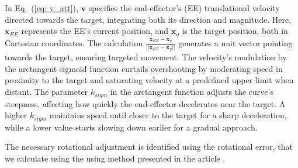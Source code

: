 \documentclass[letterpaper, 10 pt, conference]{ieeeconf}  %
\begin{document}
In Eq.~(\ref{eq: v_att}), $\mathbf{v}$ specifies the end-effector's (EE) translational velocity directed towards the target, integrating both its direction and magnitude. Here, $\mathbf{x}_{EE}$ represents the EE's current position, and $\mathbf{x}_g$ is the target position, both in Cartesian coordinates. The calculation $\frac{\mathbf{x}_{EE}-\mathbf{x}_g}{||\mathbf{x}_{EE}-\mathbf{x}_g||}$ generates a unit vector pointing towards the target, ensuring targeted movement. The velocity's modulation by the arctangent sigmoid function curtails overshooting by moderating speed in proximity to the target and saturating velocity at a predefined upper limit when distant. The parameter \(k_{sigm}\) in the arctangent function adjusts the curve's steepness, affecting how quickly the end-effector decelerates near the target. A higher \(k_{sigm}\) maintains speed until closer to the target for a sharp deceleration, while a lower value starts slowing down earlier for a gradual approach. 


The necessary rotational adjustment is identified using the rotational error, that we calculate using the using method presented in the article \cite{Zlajpah2017}. 
%
%
%
%
%
%
%
%
%
\end{document}
